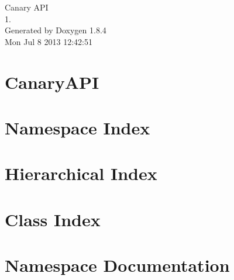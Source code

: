 \documentclass[twoside]{book}
\newcommand{\clearemptydoublepage}{%
  \newpage{\pagestyle{empty}\cleardoublepage}%
}
\begin{document}
\hypersetup{pageanchor=false}
\begin{titlepage}
\vspace*{7cm}
\begin{center}%
{\Large Canary A\-P\-I \\[1ex]\large 1. }\\
\vspace*{1cm}
{\large Generated by Doxygen 1.8.4}\\
\vspace*{0.5cm}
{\small Mon Jul 8 2013 12:42:51}\\
\end{center}
\end{titlepage}
\clearemptydoublepage
\tableofcontents
\clearemptydoublepage
{}
\hypersetup{pageanchor=true}

\chapter{Canary\-A\-P\-I}
\label{md_README}
\hypertarget{md_README}{}

\chapter{Namespace Index}

\chapter{Hierarchical Index}

\chapter{Class Index}

\chapter{Namespace Documentation}















\end{document}
